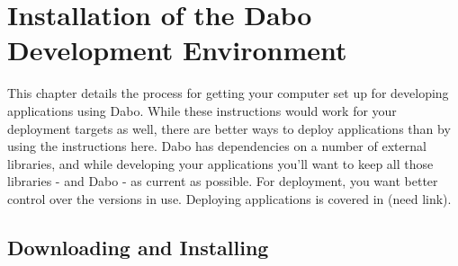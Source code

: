 
\chapter{Installation of the Dabo Development Environment}

This chapter details the process for getting your computer set up for developing applications using Dabo. While these instructions would work for your deployment targets as well, there are better ways to deploy applications than by using the instructions here. Dabo has dependencies on a number of external libraries, and while developing your applications you'll want to keep all those libraries - and Dabo - as current as possible. For deployment, you want better control over the versions in use. Deploying applications is covered in (need link).

\section{Downloading and Installing}

